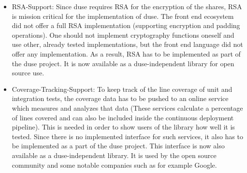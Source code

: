 \begin{itemize}
  \item RSA-Support: Since duse requires RSA for the encryption of the shares,
  RSA is mission critical for the implementation of duse. The front end ecosystem
  did not offer a full RSA implementation (supporting encryption and padding
  operations). One should not implement cryptography functions oneself and use
  other, already tested implementations, but the front end language did not offer
  any implementation. As a result, RSA has to be implemented
  as part of the duse project. It is now available as a duse-independent library
  for open source use.

  \item Coverage-Tracking-Support: To keep track of the line coverage of unit and
  integration tests, the coverage data has to be pushed to an online service
  which measures and analyzes that data (These services calculate a percentage of
  lines covered and can also be included inside the continuous deployment pipeline). This is
  needed in order to show users of the library how well it is tested. Since
  there is no implemented interface for such services, it also has to be implemented
  as a part of the duse project. This interface is now also available as a
  duse-independent library. It is used by the open source community and some notable
  companies such as for example Google.


\end{itemize}
